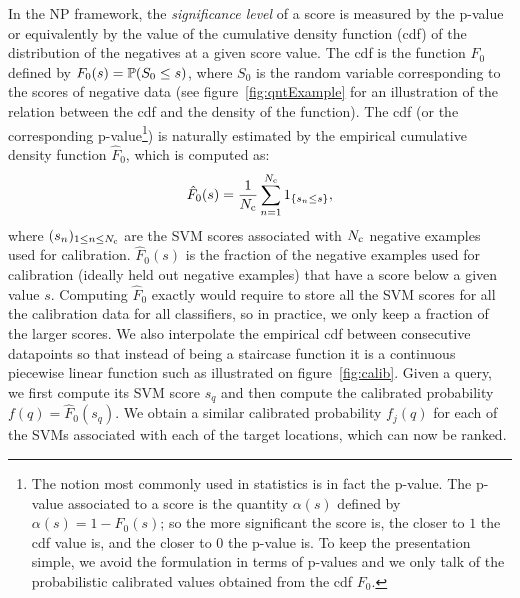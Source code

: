       In the NP framework, the \emph{significance level} of a score is measured by the p-value or equivalently by the value of the cumulative density function  (cdf) of the distribution of the negatives at a given score value. The cdf is the function $F_0$ defined by $F_0(s)=\mathbb{P}(S_0\leq s)$, where $S_0$ is the random variable corresponding to the scores of negative data (see figure~\ref{fig:qntExample} for an illustration of the relation between the cdf and the density of the function). The cdf (or the corresponding p-value\footnote{
      The notion most commonly used in statistics is in fact the p-value. The p-value associated to a score is the quantity $\alpha(s)$ defined by $\alpha(s)=1-F_0(s)$; so the more significant the score is, the closer to $1$ the cdf value is, and the closer to $0$ the p-value is. To keep the presentation simple, we avoid the formulation in terms of p-values and we only talk of the probabilistic calibrated values obtained from the cdf $F_0$.
       })
        is naturally estimated by the empirical cumulative density function $\hat{F}_0$, which is computed as: 
      $$\hat{F}_0(s)=\frac{1}{N_{\text{c}}} \sum_{n=1}^{N_{\text{c}}} 1_{\{s_n \leq s\}},$$
      where $(s_n)_{1\leq n \leq N_{\text{c}} }$ are the SVM scores associated with $N_{\text{c}}$ negative examples used for calibration.
      $\hat{F}_0(s)$ is the fraction of the negative examples used for calibration (ideally held out negative examples) that have a score below a given value $s$.
      Computing $\hat{F}_0$ exactly would require to store all the SVM scores for all the calibration data for all classifiers, so in practice, we only keep a fraction of the larger scores.
      We also interpolate the empirical cdf between consecutive datapoints so that instead of being a staircase function it is a continuous piecewise linear function such as illustrated on figure~\ref{fig:calib}. Given a query, we first compute its SVM score $s_q$ and then compute the calibrated probability $f(q)=\hat{F}_0(s_q)$.
      We obtain a similar calibrated probability $f_j(q)$ for each of the SVMs associated with each of the target locations, which can now be ranked.

